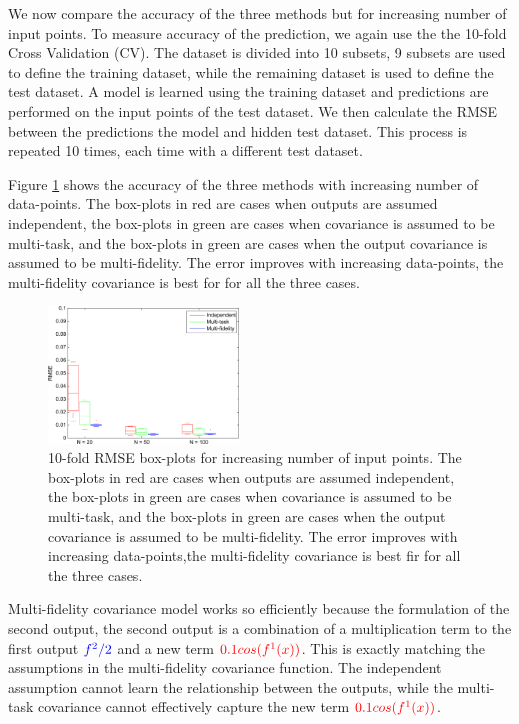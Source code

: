 \begin{mdframed}[hidealllines=true,backgroundcolor=lightgray!20]
We now compare the accuracy of the three methods but for increasing number of input points. To measure accuracy of the prediction, we again use the the 10-fold Cross Validation (CV). The dataset is divided into 10 subsets, 9 subsets are used to define the training dataset, while the remaining dataset is used to define the test dataset. A model is learned using the training dataset and predictions are performed on the input points of the test dataset. We then calculate the RMSE between the predictions the model and hidden test dataset. This process is repeated 10 times, each time with a different test dataset.  

Figure \ref{subFigboxPlotsToyDataJoint} shows the accuracy of the three methods with increasing number of data-points. The box-plots in red are cases when outputs are assumed independent, the box-plots in green are cases when covariance is assumed to be multi-task, and the box-plots in green are cases when the output covariance is assumed to be multi-fidelity. The error improves with increasing data-points, the multi-fidelity covariance is best for for all the three cases.
\end{mdframed}

\begin{figure}[!ht]
  \centering
    
        \includegraphics[width=0.45\textwidth]
        {images/part3/boxPlotsToyDataProgressionOverTime}
        \caption{10-fold RMSE box-plots for increasing number of input points. The box-plots in red are cases when outputs are assumed independent, the box-plots in green are cases when covariance is assumed to be multi-task, and the box-plots in green are cases when the output covariance is assumed to be multi-fidelity. The error improves with increasing data-points,the multi-fidelity covariance is best fir for all the three cases.}
        \label{subFigboxPlotsToyDataJoint}
\end{figure}

Multi-fidelity covariance model works so efficiently because the formulation of the second output, the second output is a combination of a multiplication term to the first output $\textcolor{blue}{f^2/2}$ and a new term $\textcolor{red}{0.1cos(f^{1}(x))}$. This is exactly matching the assumptions in the multi-fidelity covariance function. The independent assumption cannot learn the relationship between the outputs, while the multi-task covariance cannot effectively capture the new term $\textcolor{red}{0.1cos(f^{1}(x))}$.


